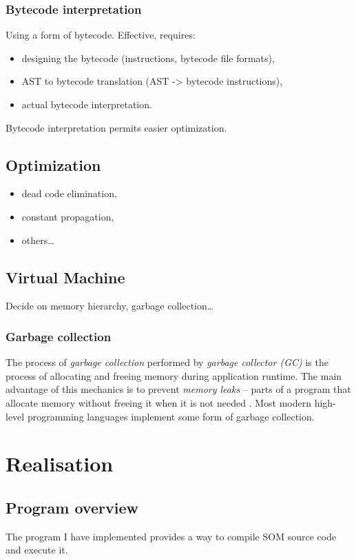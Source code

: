 \documentclass[thesis=M,english]{FITthesis}[2019/12/23]
\begin{document}
\subsection{Bytecode interpretation}
Using a form of bytecode. Effective, requires:
\begin{itemize}
	\item designing the bytecode (instructions, bytecode file formats),
	\item AST to bytecode translation (AST -> bytecode instructions),
	\item actual bytecode interpretation.
\end{itemize}
Bytecode interpretation permits easier optimization.

\section{Optimization}
\begin{itemize}
	\item dead code elimination,
	\item constant propagation,
	\item others\ldots
\end{itemize}

\section{Virtual Machine}
Decide on memory hierarchy, garbage collection\ldots

\subsection{Garbage collection}
The process of \textit{garbage collection} performed by \textit{garbage collector (GC)} is the process of allocating and freeing
memory during application runtime. The main advantage of this mechanics is to prevent \textit{memory leaks} -- parts of a program
that allocate memory without freeing it when it is not needed \cite{memleaks-raygun}. Most modern high-level programming languages
implement some form of garbage collection.



\chapter{Realisation}

\section{Program overview}
The program I have implemented provides a way to compile SOM source code and execute it.
\end{document}
